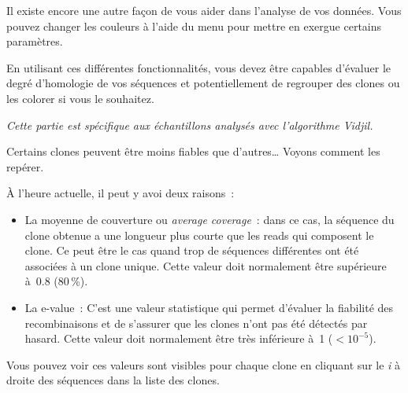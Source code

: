 \documentclass[11pt]{article}
\begin{document}
Il existe encore une autre façon de vous aider dans l'analyse de vos
données. Vous pouvez changer les
couleurs à l'aide du menu  pour mettre en
exergue certains paramètres.



En utilisant ces différentes fonctionnalités, vous devez être capables
d'évaluer le degré d'homologie de vos séquences et potentiellement de
regrouper des clones ou les colorer si vous le souhaitez.

\bigskip

\textit{Cette partie est spécifique aux échantillons analysés avec
l'algorithme Vidjil.}

Certains clones peuvent être moins fiables que d'autres\ldots{} Voyons
comment les repérer.

À l'heure actuelle, il peut y avoi deux raisons~:
\begin{itemize}
\item
  La moyenne de couverture ou \textit{average coverage}~: dans ce cas, la
  séquence du clone obtenue a une longueur plus courte que les reads qui
  composent le clone. Ce peut être le cas quand trop de séquences
  différentes ont été associées à un clone unique. Cette valeur doit
  normalement être supérieure à~0.8 (80\,\%).
\item
  La e-value~: C'est une valeur statistique qui permet d'évaluer la
  fiabilité des recombinaisons et de s'assurer que les clones n'ont pas été détectés
  par hasard. Cette valeur doit normalement être très
  inférieure à~1 ($<10^{-5}$).
\end{itemize}

Vous pouvez voir ces valeurs sont visibles pour chaque clone en cliquant
sur le \textit{i} à droite des séquences dans la liste des clones.
\end{document}
